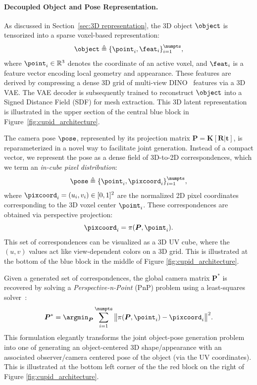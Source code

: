 \documentclass[../../book-main.tex]{subfiles}
\begin{document}
\paragraph{Decoupled Object and Pose Representation.}

As discussed in Section~\ref{sec:3D representation}, the 3D object
$\object$ is tensorized into a sparse voxel-based representation:
\begin{equation}
\object \triangleq \{\point_i, \feat_i\}_{i=1}^{\numpts},
\end{equation}
where $\point_i \in \mathbb{R}^3$ denotes the coordinate of an active
voxel, and $\feat_i$ is a feature vector encoding local geometry and
appearance. These features are derived by compressing a dense 3D grid
of multi-view DINO~\citep{oquab2023dinov2} features via a 3D VAE. The
VAE decoder is subsequently trained to reconstruct $\object$ into a
Signed Distance Field (SDF) for mesh extraction. This 3D latent
representation is illustrated in the upper section of the central
blue block in Figure~\ref{fig:cupid_architecture}.

The camera pose $\pose$, represented by its projection matrix
$\boldsymbol{P} = \boldsymbol{K}[\boldsymbol{R}|\boldsymbol{t}]$, is
reparameterized
in a novel way to facilitate joint generation. Instead of a compact
vector, we represent the pose as a dense field of 3D-to-2D
correspondences, which we term an \textit{in-cube pixel distribution}:
\[
\pose \triangleq \{\point_i, \pixcoord_i\}_{i=1}^{\numpts},
\]
where $\pixcoord_i = (u_i, v_i) \in [0,1]^2$ are the normalized 2D
pixel coordinates corresponding to the 3D voxel center $\point_i$.
These correspondences are obtained via perspective projection:
\[
\pixcoord_i = \pi(\boldsymbol{P}, \point_i).
\]
This set of correspondences can be visualized as a 3D UV cube, where
the $(u,v)$ values act like view-dependent colors on a 3D grid. This
is illustrated at the bottom of the blue block in the middle of
Figure \ref{fig:cupid_architecture}.

Given a generated set of correspondences, the global camera matrix
$\boldsymbol{P}^{*}$ is recovered by solving a {\em Perspective-n-Point}
(PnP) problem using a least-squares solver~\citep{abdel2015direct}:
\begin{equation}
\boldsymbol{P}^{*} = \argmin_{\boldsymbol{P}} \sum_{i=1}^{\numpts}
\big\|\pi(\boldsymbol{P},\point_i) - \pixcoord_i\big\|^2.
\label{eq:pnp}
\end{equation}
This formulation elegantly transforms the joint object-pose
generation problem into one of generating an object-centered 3D
shape/appearance with an associated observer/camera centered pose of
the object (via the UV coordinates). This is illustrated at the
bottom left corner of the the red block on the right of Figure
\ref{fig:cupid_architecture}.
\end{document}
